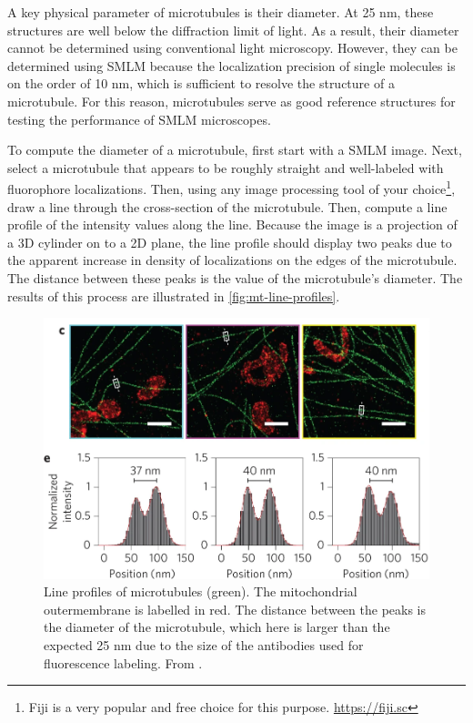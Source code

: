 \documentclass[10pt,a4paper,oneside]{book}
\begin{document}
A key physical parameter of microtubules is their diameter. At 25 nm, these structures are well below the diffraction limit of light. As a result, their diameter cannot be determined using conventional light microscopy. However, they can be determined using SMLM because the localization precision of single molecules is on the order of 10 nm, which is sufficient to resolve the structure of a microtubule. For this reason, microtubules serve as good reference structures for testing the performance of SMLM microscopes.

To compute the diameter of a microtubule, first start with a SMLM image. Next, select a microtubule that appears to be roughly straight and well-labeled with fluorophore localizations. Then, using any image processing tool of your choice\footnote{Fiji is a very popular and free choice for this purpose. \url{https://fiji.sc}}, draw a line through the cross-section of the microtubule. Then, compute a line profile of the intensity values along the line. Because the image is a projection of a 3D cylinder on to a 2D plane, the line profile should display two peaks due to the apparent increase in density of localizations on the edges of the microtubule. The distance between these peaks is the value of the microtubule's diameter. The results of this process are illustrated in \autoref{fig:mt-line-profiles}.

\begin{figure}[ht]
    \centering
    \includegraphics[width=1.0\textwidth]{mt-line-profiles.png}
    \caption{Line profiles of microtubules (green). The mitochondrial outermembrane is labelled in red. The distance between the peaks is the diameter of the microtubule, which here is larger than the expected 25 nm due to the size of the antibodies used for fluorescence labeling. From \cite{douglass-naturephotonics-2016}.}
    \label{fig:mt-line-profiles}
\end{figure}
\end{document}
